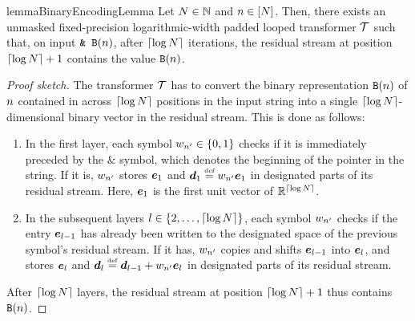 \begin{restatable}{lemma}{BinaryEncodingLemma} \label{lem:binary-encoding}
   Let ${{N}} \in {{\mathbb{N}}}$ and ${{n}} \in {\left[ {{N}}\right]}$.
   Then, there exists an unmasked fixed-precision logarithmic-width padded looped transformer ${{\mathcal{T}}}$ such that, on input $\texttt{\& } \binEnc{\stridx}$, after $\lceil\log {{N}}\rceil$ iterations, the residual stream at position $\lceil\log {{N}}\rceil + 1$ contains the value $\binEnc{\stridx}$.
\end{restatable}
\begin{proof}[Proof sketch]
   The transformer ${{\mathcal{T}}}$ has to convert the binary representation $\binEnc{\stridx}$ of ${{n}}$ contained in across $\lceil\log {{N}}\rceil$ positions in the input string into a single $\lceil\log {{N}}\rceil$-dimensional binary vector in the residual stream.
   This is done as follows:
   \begin{enumerate}[label=\arabic*.,noitemsep]
      \item In the first layer, each symbol ${{w}}_{{{n}}'} \in {\left\{ 0, 1 \right\}}$ checks if it is immediately preceded by the $\texttt{\&}$ symbol, which denotes the beginning of the pointer in the string. 
      If it is, ${{w}}_{{{n}}'}$ stores ${{{\bm{e}}}}_1$ and ${{{\bm{d}}}}_1 \mathrel{\stackrel{\textnormal{\tiny def}}{=}} {{w}}_{{{n}}'} {{{\bm{e}}}}_1$ in designated parts of its residual stream. 
      Here, ${{{\bm{e}}}}_1$ is the first unit vector of ${{\mathbb{R}}}^{\lceil\log {{N}}\rceil}$.
      \item In the subsequent layers ${{l}} \in {\left\{ 2, \ldots, \lceil\log{{N}}\rceil \right\}}$, each symbol ${{w}}_{{{n}}'}$ checks if the entry ${{{\bm{e}}}}_{{{l}} - 1}$ has already been written to the designated space of the previous symbol's residual stream.
      If it has, ${{w}}_{{{n}}'}$ copies and shifts ${{{\bm{e}}}}_{{{l}} - 1}$ into ${{{\bm{e}}}}_{{{l}}}$, and stores ${{{\bm{e}}}}_{{{l}}}$ and ${{{\bm{d}}}}_{{{l}}} \mathrel{\stackrel{\textnormal{\tiny def}}{=}} {{{\bm{d}}}}_{{{l}} - 1} + {{w}}_{{{n}}'} {{{\bm{e}}}}_{{{l}}}$ in designated parts of its residual stream.
   \end{enumerate}
   After $\lceil\log {{N}}\rceil$ layers, the residual stream at position $\lceil\log {{N}}\rceil + 1$ thus contains $\binEnc{\stridx}$.
\end{proof}

